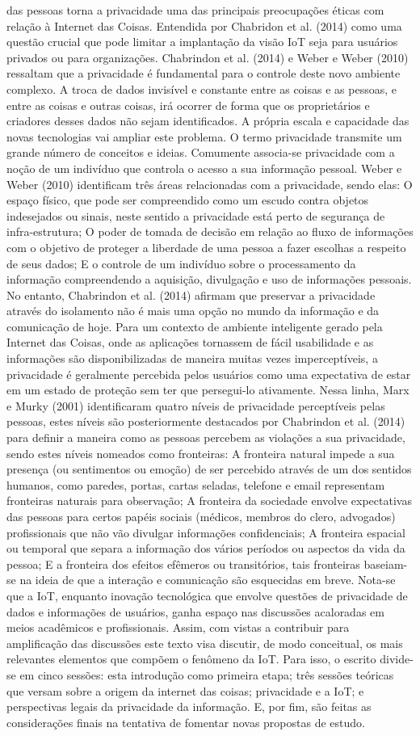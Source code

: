 das pessoas torna a privacidade uma das principais preocupações éticas com relação à Internet das Coisas. Entendida por Chabridon et al. (2014) como uma questão crucial que pode limitar a implantação da visão IoT seja para usuários privados ou para organizações. Chabrindon et al. (2014) e Weber e Weber (2010) ressaltam que a privacidade é fundamental para o controle deste novo ambiente complexo. A troca de dados invisível e constante entre as coisas e as pessoas, e entre as coisas e outras coisas, irá ocorrer de forma que os proprietários e criadores desses dados não sejam identificados. A própria escala e capacidade das novas tecnologias vai ampliar este problema. O termo privacidade transmite um grande número de conceitos e ideias. Comumente associa-se privacidade com a noção de um indivíduo que controla o acesso a sua informação pessoal. Weber e Weber (2010) identificam três áreas relacionadas com a privacidade, sendo elas: O espaço físico, que pode ser compreendido como um escudo contra objetos indesejados ou sinais, neste sentido a privacidade está perto de segurança de infra-estrutura; O poder de tomada de decisão em relação ao fluxo de informações com o objetivo de proteger a liberdade de uma pessoa a fazer escolhas a respeito de seus dados; E o controle de um indivíduo sobre o processamento da informação compreendendo a aquisição, divulgação e uso de informações pessoais. No entanto, Chabrindon et al. (2014) afirmam que preservar a privacidade através do isolamento não é mais uma opção no mundo da informação e da comunicação de hoje. Para um contexto de ambiente inteligente gerado pela Internet das Coisas, onde as aplicações tornassem de fácil usabilidade e as informações são disponibilizadas de maneira muitas vezes imperceptíveis, a privacidade é geralmente percebida pelos usuários como uma expectativa de estar em um estado de proteção sem ter que persegui-lo ativamente. Nessa linha, Marx e Murky (2001) identificaram quatro níveis de privacidade perceptíveis pelas pessoas, estes níveis são posteriormente destacados por Chabrindon et al. (2014) para definir a maneira como as pessoas percebem as violações a sua privacidade, sendo estes níveis nomeados como fronteiras: A fronteira natural impede a sua presença (ou sentimentos ou emoção) de ser percebido através de um dos sentidos humanos, como paredes, portas, cartas seladas, telefone e email representam fronteiras naturais para observação; A fronteira da sociedade envolve expectativas das pessoas para certos papéis sociais (médicos, membros do clero, advogados) profissionais que não vão divulgar informações confidenciais; A fronteira espacial ou temporal que separa a informação dos vários períodos ou aspectos da vida da pessoa; E a fronteira dos efeitos efêmeros ou transitórios, tais fronteiras baseiam-se na ideia de que a interação e comunicação são esquecidas em breve. Nota-se que a IoT, enquanto inovação tecnológica que envolve questões de privacidade de dados e informações de usuários, ganha espaço nas discussões acaloradas em meios acadêmicos e profissionais. Assim, com vistas a contribuir para amplificação das discussões este texto visa discutir, de modo conceitual, os mais relevantes elementos que compõem o fenômeno da IoT. Para isso, o escrito divide-se em cinco sessões: esta introdução como primeira etapa; três sessões teóricas que versam sobre a origem da internet das coisas; privacidade e a IoT; e perspectivas legais da privacidade da informação. E, por fim, são feitas as considerações finais na tentativa de fomentar novas propostas de estudo.
